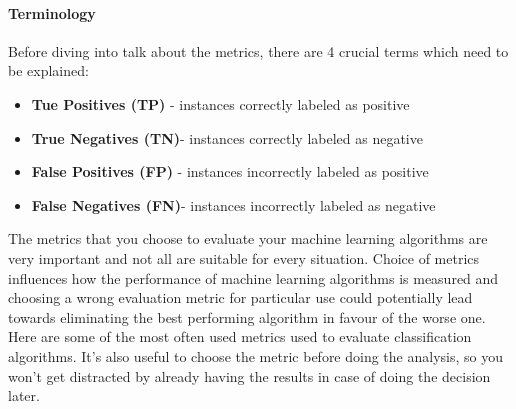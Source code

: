 \paragraph{Terminology} Before diving into talk about the metrics, there are 4 crucial terms which need to be explained:
\begin{itemize}
\item \textbf{Tue Positives (TP)} - instances correctly labeled as positive
\item \textbf{True Negatives (TN)}- instances correctly labeled as negative
\item \textbf{False Positives (FP)} - instances incorrectly labeled as positive
\item \textbf{False Negatives (FN)}- instances incorrectly labeled as negative
\end{itemize}


The metrics that you choose to evaluate your machine learning algorithms are very important and not all are suitable for every situation. Choice of metrics influences how the performance of machine learning algorithms is measured and choosing a wrong evaluation metric for particular use could potentially lead towards eliminating the best performing algorithm in favour of the worse one.
Here are some of the most often used metrics used to evaluate classification algorithms. It's also useful to choose the metric before doing the analysis, so you won't get distracted by already having the results in case of doing the decision later.

